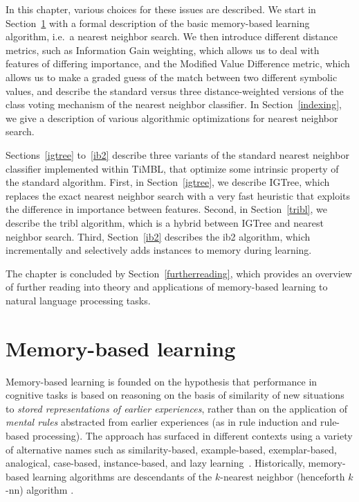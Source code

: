 \documentclass{book}
\begin{document}
In this chapter, various choices for these issues are described. We
start in Section~\ref{mbl} with a formal description of the basic
memory-based learning algorithm, i.e.~a nearest neighbor search. We
then introduce different distance metrics, such as Information Gain
weighting, which allows us to deal with features of differing
importance, and the Modified Value Difference metric, which allows us
to make a graded guess of the match between two different symbolic
values, and describe the standard versus three distance-weighted
versions of the class voting mechanism of the nearest neighbor
classifier. In Section~\ref{indexing}, we give a description of
various algorithmic optimizations for nearest neighbor search.

Sections~\ref{igtree} to~\ref{ib2} describe three variants of the
standard nearest neighbor classifier implemented within TiMBL, that
optimize some intrinsic property of the standard algorithm. First, in
Section~\ref{igtree}, we describe {\sc IGTree}, which replaces the
exact nearest neighbor search with a very fast heuristic that exploits
the difference in importance between features. Second, in
Section~\ref{tribl}, we describe the {\sc tribl} algorithm, which is a
hybrid between {\sc IGTree} and nearest neighbor search. Third,
Section~\ref{ib2} describes the {\sc ib2} algorithm, which
incrementally and selectively adds instances to memory during
learning.

The chapter is concluded by Section~\ref{furtherreading}, which
provides an overview of further reading into theory and applications
of memory-based learning to natural language processing tasks.

\section{Memory-based learning}
\label{mbl}

Memory-based learning is founded on the hypothesis that performance in
cognitive tasks is based on reasoning on the basis of similarity of
new situations to {\em stored representations of earlier experiences},
rather than on the application of {\em mental rules}\/ abstracted from
earlier experiences (as in rule induction and rule-based processing).
The approach has surfaced in different contexts using a variety of
alternative names such as similarity-based, example-based,
exemplar-based, analogical, case-based, in\-stance-based, and lazy
learning~\cite{Stanfill+86,Aha+91,Cost+93,Kolodner93,Aha97a}.
Historically, memory-based learning algorithms are descendants of the
$k$-nearest neighbor (henceforth $k$-{\sc nn}) algorithm
\cite{Cover+67,Devijver+82,Aha+91}.
\end{document}
